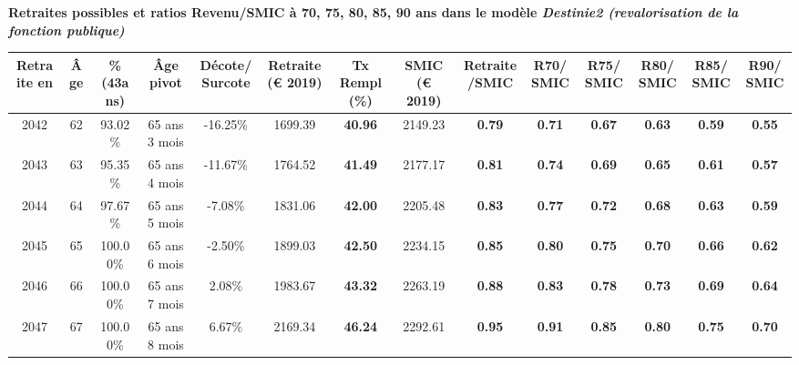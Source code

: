  \vspace{0.1cm} 
{\bf \noindent Retraites possibles et ratios Revenu/SMIC à 70, 75, 80, 85, 90 ans dans le modèle \emph{Destinie2 (revalorisation de la fonction publique)}}  
 
\begin{adjustbox}{max width=\textwidth} 
\begin{tabular}[htb]{|c|c||c|c|c||c|c||c|c||c|c|c|c|c|} 
\hline 
 Retraite en &  Âge &  \%(43ans) &  Âge pivot &  Décote/Surcote &  Retraite (\euro{} 2019) &  Tx Rempl(\%) &  SMIC (\euro{} 2019) &  Retraite/SMIC &  R70/SMIC &  R75/SMIC &  R80/SMIC &  R85/SMIC &  R90/SMIC \\ 
\hline \hline 
 2042 &  62 &  93.02\% &  65 ans 3 mois &  -16.25\% &  1699.39 &  {\bf 40.96} &  2149.23 &  {\bf {\color{red} 0.79}} &  {\bf {\color{red} 0.71}} &  {\bf {\color{red} 0.67}} &  {\bf {\color{red} 0.63}} &  {\bf {\color{red} 0.59}} &  {\bf {\color{red} 0.55}} \\ 
\hline 
 2043 &  63 &  95.35\% &  65 ans 4 mois &  -11.67\% &  1764.52 &  {\bf 41.49} &  2177.17 &  {\bf {\color{red} 0.81}} &  {\bf {\color{red} 0.74}} &  {\bf {\color{red} 0.69}} &  {\bf {\color{red} 0.65}} &  {\bf {\color{red} 0.61}} &  {\bf {\color{red} 0.57}} \\ 
\hline 
 2044 &  64 &  97.67\% &  65 ans 5 mois &  -7.08\% &  1831.06 &  {\bf 42.00} &  2205.48 &  {\bf {\color{red} 0.83}} &  {\bf {\color{red} 0.77}} &  {\bf {\color{red} 0.72}} &  {\bf {\color{red} 0.68}} &  {\bf {\color{red} 0.63}} &  {\bf {\color{red} 0.59}} \\ 
\hline 
 2045 &  65 &  100.00\% &  65 ans 6 mois &  -2.50\% &  1899.03 &  {\bf 42.50} &  2234.15 &  {\bf {\color{red} 0.85}} &  {\bf {\color{red} 0.80}} &  {\bf {\color{red} 0.75}} &  {\bf {\color{red} 0.70}} &  {\bf {\color{red} 0.66}} &  {\bf {\color{red} 0.62}} \\ 
\hline 
 2046 &  66 &  100.00\% &  65 ans 7 mois &  2.08\% &  1983.67 &  {\bf 43.32} &  2263.19 &  {\bf {\color{red} 0.88}} &  {\bf {\color{red} 0.83}} &  {\bf {\color{red} 0.78}} &  {\bf {\color{red} 0.73}} &  {\bf {\color{red} 0.69}} &  {\bf {\color{red} 0.64}} \\ 
\hline 
 2047 &  67 &  100.00\% &  65 ans 8 mois &  6.67\% &  2169.34 &  {\bf 46.24} &  2292.61 &  {\bf {\color{red} 0.95}} &  {\bf {\color{red} 0.91}} &  {\bf {\color{red} 0.85}} &  {\bf {\color{red} 0.80}} &  {\bf {\color{red} 0.75}} &  {\bf {\color{red} 0.70}} \\ 
\hline 
\hline 
\end{tabular} 
\end{adjustbox} 
 
